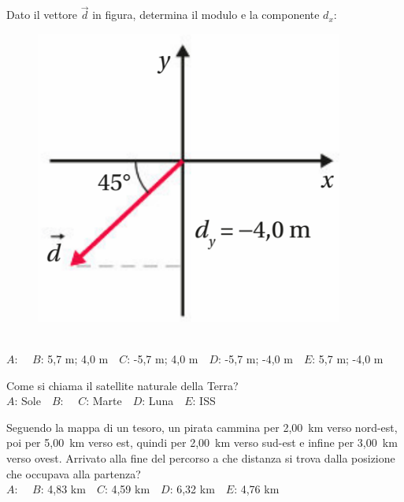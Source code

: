 \mcquestionheader Dato il vettore $\vec{d}$ in figura, determina il modulo e la componente $d_x$: \begin{figure}[h!]   \begin{center}     \includegraphics[scale=0.35]{vettored.png}   \end{center} \end{figure}\\
{$A$}: \ \ {$B$}: 5,7 m; 4,0 m\ \ {$C$}: -5,7 m; 4,0 m\ \ {$D$}: -5,7 m; -4,0 m\ \ {$E$}: 5,7 m; -4,0 m\ \ 

\mcquestionfooter



\def\mcquestionnumber{12}


\mcquestionheader Come si chiama il satellite naturale della Terra?\\
{$A$}: Sole\ \ {$B$}: \ \ {$C$}: Marte\ \ {$D$}: Luna\ \ {$E$}: ISS\ \ 

\mcquestionfooter



\mcpaperfooter

\def\mcserialnumber{35}
\mcpaperheader


\def\mcquestionnumber{1}


\mcquestionheader Seguendo la mappa di un tesoro, un pirata cammina per 2,00~km verso nord-est, poi per 5,00~km verso est, quindi per 2,00~km verso sud-est e infine per 3,00~km verso ovest. Arrivato alla fine del percorso a che distanza si trova dalla posizione che occupava alla partenza?\\
{$A$}: \ \ {$B$}: 4,83 km\ \ {$C$}: 4,59 km\ \ {$D$}: 6,32 km\ \ {$E$}: 4,76 km\ \ 

